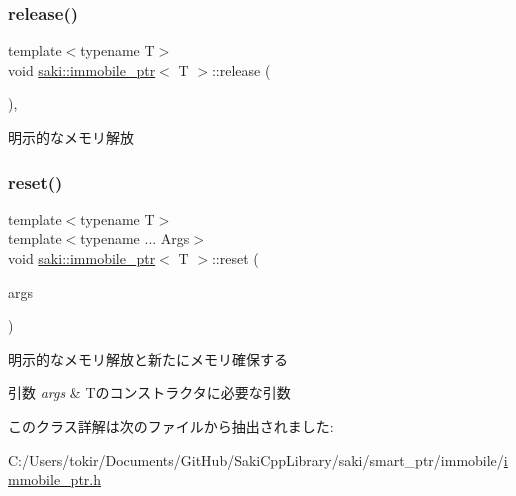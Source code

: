 \mbox{\label{classsaki_1_1immobile__ptr_a889ef4da216534edcf859d9da97e5955}} 
\subsubsection{\texorpdfstring{release()}{release()}}
{\footnotesize\ttfamily template$<$typename T$>$ \\
void \mbox{\hyperlink{classsaki_1_1immobile__ptr}{saki\+::immobile\+\_\+ptr}}$<$ T $>$\+::release (\begin{DoxyParamCaption}{ }\end{DoxyParamCaption})\hspace{0.3cm}{\ttfamily [inline]}, {\ttfamily [noexcept]}}



明示的なメモリ解放 

\mbox{\label{classsaki_1_1immobile__ptr_ad2e77d17881c8e10ba918f80fd9ad1cd}} 
\subsubsection{\texorpdfstring{reset()}{reset()}}
{\footnotesize\ttfamily template$<$typename T$>$ \\
template$<$typename ... Args$>$ \\
void \mbox{\hyperlink{classsaki_1_1immobile__ptr}{saki\+::immobile\+\_\+ptr}}$<$ T $>$\+::reset (\begin{DoxyParamCaption}\item[{Args ...}]{args }\end{DoxyParamCaption})\hspace{0.3cm}{\ttfamily [inline]}}



明示的なメモリ解放と新たにメモリ確保する 


\begin{DoxyParams}{引数}
{\em args} & Tのコンストラクタに必要な引数 \\
\hline
\end{DoxyParams}


このクラス詳解は次のファイルから抽出されました\+:\begin{DoxyCompactItemize}
\item 
C\+:/\+Users/tokir/\+Documents/\+Git\+Hub/\+Saki\+Cpp\+Library/saki/smart\+\_\+ptr/immobile/\mbox{\hyperlink{immobile__ptr_8h}{immobile\+\_\+ptr.\+h}}\end{DoxyCompactItemize}
